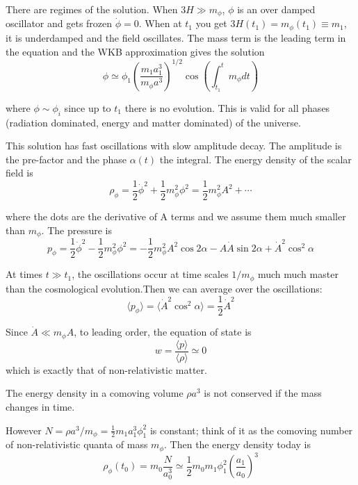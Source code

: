 \documentclass[11pt]{book}
\begin{document}
There are regimes of the solution. When $3H \gg m_\phi$, $\phi$ is an over damped oscillator and gets frozen $\dot \phi = 0$. When at $t_1$ you get $3H(t_1) = m_\phi(t_1) \equiv m_1$, it is underdamped and the field oscillates. The mass term is the leading term in the equation and the WKB approximation gives the solution
\[
\phi \simeq \phi_1 (\frac{m_1 a_1^3}{m_\phi a^3})^{1/2} \cos{(\int_{t_1}^t m_\phi dt)} 
\]

where $\phi \sim \phi_i$ since up to $t_1$ there is no evolution. This is valid for all phases (radiation dominated, energy and matter dominated) of the universe.

This solution has fast oscillations with slow amplitude decay. The amplitude is the pre-factor and the phase $\alpha(t)$ the integral. The energy density of the scalar field is 
\[
\rho_\phi =\frac{1}{2}\dot \phi^2 + \frac{1}{2}m_\phi^2 \phi^2 = \frac{1}{2}m_\phi^2 A^2 + \cdots \]

where the dots are the derivative of A terms and we assume them much smaller than $m_\phi$.  The pressure is 
\[ 
p_\phi = \frac{1}{2} \dot \phi^2 - \frac{1}{2} m_\phi^2 \phi^2 = -\frac{1}{2} m_\phi^2 A^2 \cos{2\alpha} - A \dot A \sin{2\alpha} + \dot A^2 \cos^2{\alpha} 
\]

At times $t \gg t_1$, the oscillations occur at time scales $1/m_\phi$ much much master than the cosmological evolution.Then we can average over the oscillations:
\[ 
\langle p_\phi \rangle = \langle \dot A^2 \cos^2{\alpha} \rangle = \frac{1}{2} \dot A^2 \]

Since $\dot A \ll m_\phi A$, to leading order, the equation of state is 
\[
w = \frac{ \langle p \rangle}{\langle \rho \rangle} \simeq 0 \]
which is exactly that of non-relativistic matter.

The energy density in a comoving volume $\rho a^3$ is not conserved if the mass changes in time.

However $N = \rho a^3/m_\phi = \frac{1}{2} m_1 a_1^3 \phi_1^2$ is constant; think of it as the comoving number of non-relativistic quanta of mass $m_{\phi}$. Then the  energy density today is
\[
\rho_{\phi}(t_0) = m_0 \frac{N}{a_0^3} \simeq \frac{1}{2}m_0 m_1 \phi_1^2 (\frac{a_1}{a_0})^3
\]
\end{document}
